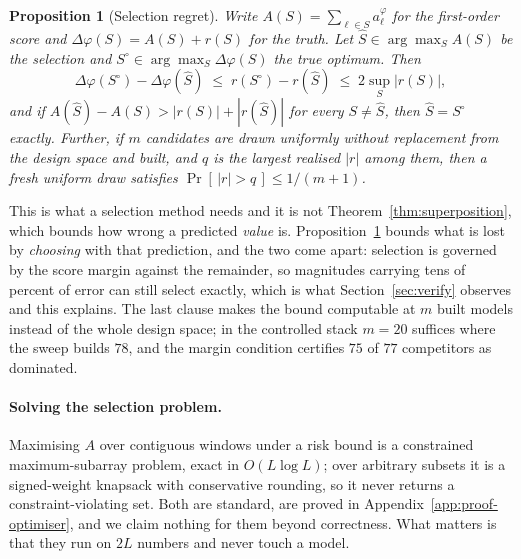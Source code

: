 \documentclass[10pt]{article}
\theoremstyle{plain}
\newtheorem{proposition}[theorem]{Proposition}
\theoremstyle{definition}
\theoremstyle{remark}
\begin{document}
\begin{proposition}[Selection regret]
\label{prop:regret}
Write $A(S)=\sum_{\ell\in S}a^{\varphi}_\ell$ for the first-order score and
$\Delta\varphi(S)=A(S)+r(S)$ for the truth. Let $\widehat{S}\in\arg\max_S A(S)$ be
the selection and $S^{\circ}\in\arg\max_S \Delta\varphi(S)$ the true optimum.
Then
\begin{equation}
\Delta\varphi(S^{\circ})-\Delta\varphi(\widehat{S})
\;\le\; r(S^{\circ})-r(\widehat{S}) \;\le\; 2\sup_S|r(S)| ,
\end{equation}
and if $A(\widehat{S})-A(S) > |r(S)|+|r(\widehat{S})|$ for every $S\neq\widehat{S}$,
then $\widehat{S}=S^{\circ}$ exactly. Further, if $m$ candidates are drawn
uniformly without replacement from the design space and built, and $q$ is the
largest realised $|r|$ among them, then a fresh uniform draw satisfies
$\Pr[\,|r|>q\,]\le 1/(m+1)$.
\end{proposition}

This is what a selection method needs and it is not
Theorem~\ref{thm:superposition}, which bounds how wrong a predicted \emph{value}
is. Proposition~\ref{prop:regret} bounds what is lost by \emph{choosing} with
that prediction, and the two come apart: selection is governed by the score
margin against the remainder, so magnitudes carrying tens of percent of error can
still select exactly, which is what Section~\ref{sec:verify} observes and this
explains. The last clause makes the bound computable at $m$ built models instead
of the whole design space; in the controlled stack $m=20$ suffices where the
sweep builds $78$, and the margin condition certifies $75$ of $77$ competitors as
dominated.

\paragraph{Solving the selection problem.} Maximising $A$ over contiguous windows
under a risk bound is a constrained maximum-subarray problem, exact in
$O(L\log L)$; over arbitrary subsets it is a signed-weight knapsack with
conservative rounding, so it never returns a constraint-violating set. Both are
standard, are proved in Appendix~\ref{app:proof-optimiser}, and we claim nothing
for them beyond correctness. What matters is that they run on $2L$ numbers and
never touch a model.
\end{document}
